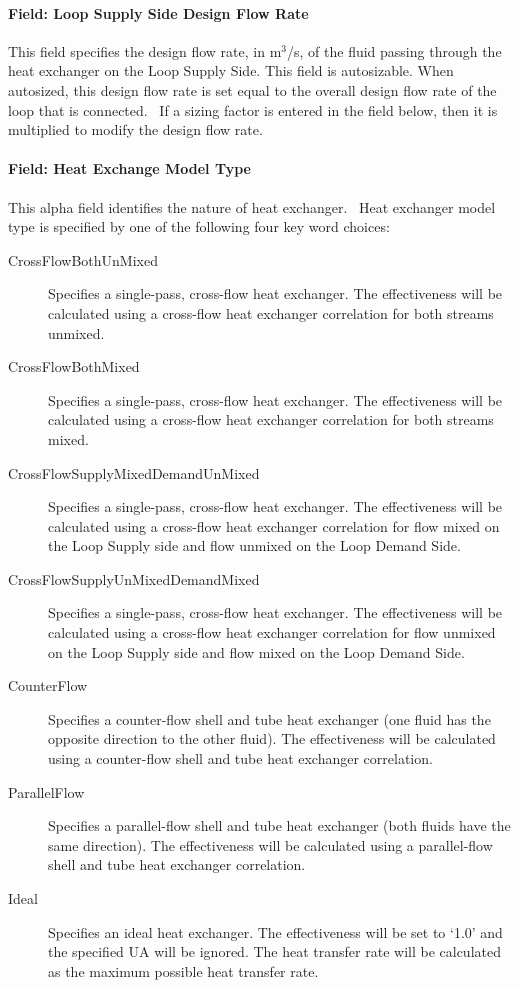 \paragraph{Field: Loop Supply Side Design Flow Rate}\label{field-loop-supply-side-design-flow-rate}

This field specifies the design flow rate, in m\(^{3}\)/s, of the fluid passing through the heat exchanger on the Loop Supply Side. This field is autosizable. When autosized, this design flow rate is set equal to the overall design flow rate of the loop that is connected.~ If a sizing factor is entered in the field below, then it is multiplied to modify the design flow rate.

\paragraph{Field: Heat Exchange Model Type}\label{field-heat-exchange-model-type}

This alpha field identifies the nature of heat exchanger.~ Heat exchanger model type is specified by one of the following four key word choices:

\begin{description}
\item [CrossFlowBothUnMixed] Specifies a single-pass, cross-flow heat exchanger. The effectiveness will be calculated using a cross-flow heat exchanger correlation for both streams unmixed.
\item [CrossFlowBothMixed]  Specifies a single-pass, cross-flow heat exchanger. The effectiveness will be calculated using a cross-flow heat exchanger correlation for both streams mixed.
\item [CrossFlowSupplyMixedDemandUnMixed] Specifies a single-pass, cross-flow heat exchanger. The effectiveness will be calculated using a cross-flow heat exchanger correlation for flow mixed on the Loop Supply side and flow unmixed on the Loop Demand Side.
\item [CrossFlowSupplyUnMixedDemandMixed] Specifies a single-pass, cross-flow heat exchanger. The effectiveness will be calculated using a cross-flow heat exchanger correlation for flow unmixed on the Loop Supply side and flow mixed on the Loop Demand Side.
\item [CounterFlow] Specifies a counter-flow shell and tube heat exchanger (one fluid has the opposite direction to the other fluid). The effectiveness will be calculated using a counter-flow shell and tube heat exchanger correlation.
\item [ParallelFlow] Specifies a parallel-flow shell and tube heat exchanger (both fluids have the same direction). The effectiveness will be calculated using a parallel-flow shell and tube heat exchanger correlation.
\item [Ideal] Specifies an ideal heat exchanger. The effectiveness will be set to `1.0' and the specified UA will be ignored. The heat transfer rate will be calculated as the maximum possible heat transfer rate.
\end{description}

